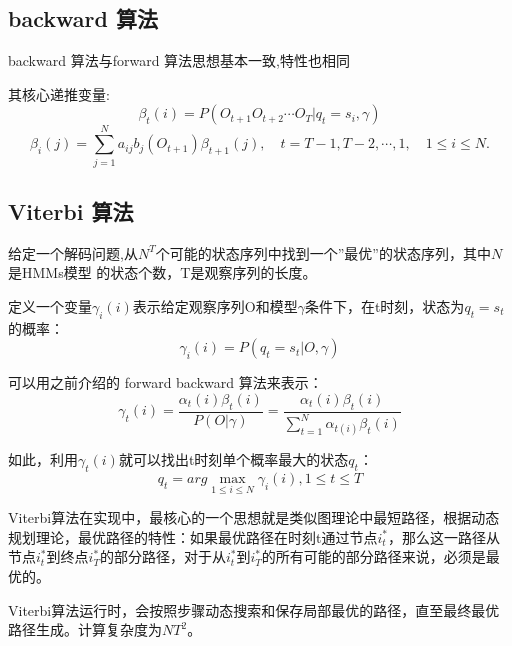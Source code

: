 \documentclass[a4paper]{ctexart}
\begin{document}
\subsection{backward 算法}
\par backward 算法与forward 算法思想基本一致,特性也相同
\par 其核心递推变量:
\begin{equation}
    \beta_{t}(i) = P(O_{t+1} O_{t+2} \cdots O_{T} | q_{t} = s_{i}, \gamma)
\end{equation}
\begin{equation}
    \beta_{i}(j) = \sum_{j=1}^{N} a_{ij}b_{j}(O_{t+1})\beta_{t+1}(j), \quad t=T-1, T-2, \cdots, 1, \quad 1\le i \le N.
\end{equation}

\subsection{Viterbi 算法}
\par 给定一个解码问题,从$N^T$个可能的状态序列中找到一个''最优''的状态序列，其中$N$是HMMs模型 的状态个数，T是观察序列的长度。
\par 定义一个变量$\gamma_i(i)$表示给定观察序列O和模型$\gamma$条件下，在t时刻，状态为$q_t = s_t$的概率：
\begin{equation}
    \gamma_{i}(i) = P(q_t = s_t | O, \gamma)
\end{equation}
\par 可以用之前介绍的 forward \quad  backward 算法来表示：
\begin{equation}
    \gamma_t(i) = \frac{\alpha_{t}(i) \beta_t(i)}
    {P(O|\gamma)}
    = \frac{\alpha_t{(i)} \beta_{t}(i)}
    {\sum_{t=1}^{N}\alpha_{t(i)}\beta_{t}(i)}
\end{equation}
\par 如此，利用$\gamma_{t}(i)$就可以找出t时刻单个概率最大的状态$q_{t}$：
\begin{equation}
    q_t = arg\max_{1 \le i \le N}{\gamma_{i}(i)}, 1\le t \le T
\end{equation}

\par Viterbi算法在实现中，最核心的一个思想就是类似图理论中最短路径，根据动态规划理论，最优路径的特性：如果最优路径在时刻t通过节点$i_{t}^{*}$，那么这一路径从节点$i_{t}^{*}$到终点$i_{T}^{*}$的部分路径，对于从$i_{t}^{*}$到$i_{T}^{*}$的所有可能的部分路径来说，必须是最优的。
\par Viterbi算法运行时，会按照步骤动态搜索和保存局部最优的路径，直至最终最优路径生成。计算复杂度为$NT^2$。
\end{document}
